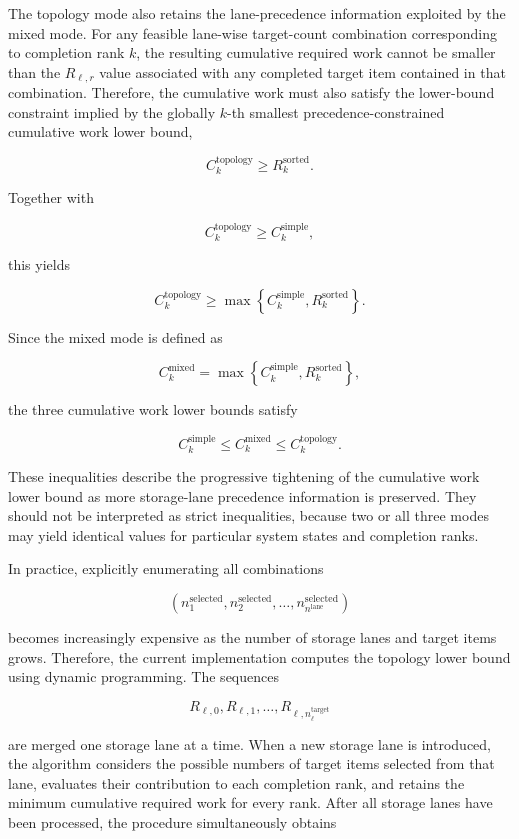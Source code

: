 The topology mode also retains the lane-precedence information exploited by the
mixed mode. For any feasible lane-wise target-count combination corresponding
to completion rank \(k\), the resulting cumulative required work cannot be
smaller than the \(R_{\ell,r}\) value associated with any completed target item
contained in that combination. Therefore, the cumulative work must also satisfy
the lower-bound constraint implied by the globally \(k\)-th smallest
precedence-constrained cumulative work lower bound,

\[
C_k^{\mathrm{topology}}
\geq
R_k^{\mathrm{sorted}}.
\]

Together with

\[
C_k^{\mathrm{topology}}
\geq
C_k^{\mathrm{simple}},
\]

this yields

\[
C_k^{\mathrm{topology}}
\geq
\max
\left\{
C_k^{\mathrm{simple}},
R_k^{\mathrm{sorted}}
\right\}.
\]

Since the mixed mode is defined as

\[
C_k^{\mathrm{mixed}}
=
\max
\left\{
C_k^{\mathrm{simple}},
R_k^{\mathrm{sorted}}
\right\},
\]

the three cumulative work lower bounds satisfy

\[
C_k^{\mathrm{simple}}
\leq
C_k^{\mathrm{mixed}}
\leq
C_k^{\mathrm{topology}}.
\]

These inequalities describe the progressive tightening of the cumulative work
lower bound as more storage-lane precedence information is preserved. They
should not be interpreted as strict inequalities, because two or all three
modes may yield identical values for particular system states and completion
ranks.

In practice, explicitly enumerating all combinations

\[
\left(
n_{1}^{\mathrm{selected}},
n_{2}^{\mathrm{selected}},
\ldots,
n_{n^{\mathrm{lane}}}^{\mathrm{selected}}
\right)
\]

becomes increasingly expensive as the number of storage lanes and target items
grows. Therefore, the current implementation computes the topology lower bound
using dynamic programming. The sequences

\[
R_{\ell,0},
R_{\ell,1},
\ldots,
R_{\ell,n_{\ell}^{\mathrm{target}}}
\]

are merged one storage lane at a time. When a new storage lane is introduced,
the algorithm considers the possible numbers of target items selected from that
lane, evaluates their contribution to each completion rank, and retains the
minimum cumulative required work for every rank. After all storage lanes have
been processed, the procedure simultaneously obtains

